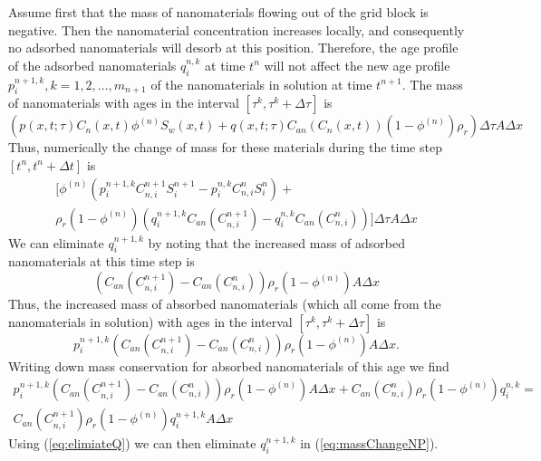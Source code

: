 \documentclass[nanomaterials,article,submit,moreauthors,pdftex]{Definitions/mdpi}
\begin{document}
Assume first that the mass of nanomaterials flowing out of the grid block is negative. Then the nanomaterial concentration increases locally, and consequently no adsorbed nanomaterials will desorb at this position. Therefore, the age profile of the adsorbed nanomaterials $q_i^{n,k}$ at time $t^n$ will not affect the new age profile  $p_i^{n+1,k},k=1,2,...,m_{n+1}$ of the nanomaterials in solution at time  $t^{n+1}$. The mass of nanomaterials with ages in the interval $\left[\tau^k, \tau^k+\Delta\tau\right]$ is
\begin{equation*}
    \left(p(x,t;\tau)C_n(x,t)\phi^{(n)}S_w(x,t) + q(x,t;\tau)C_{an}(C_n(x,t))(1-\phi^{(n)})\rho_r\right) \Delta\tau A\Delta x
\end{equation*}
Thus, numerically the change of mass for these materials during the time step $\left[t^n, t^n+\Delta t\right]$ is
\begin{multline} \label{eq:massChangeNP} %
    \bigg[\phi^{(n)}\left(p_i^{n+1,k}C_{n,i}^{n+1}S_i^{n+1}- p_{i}^{n,k}C_{n,i}^{n}S_{i}^{n}\right) +\\ \rho_r(1-\phi^{(n)}) \left(q_i^{n+1,k}C_{an}(C_{n,i}^{n+1})- q_{i}^{n,k}C_{an}(C_{n,i}^{n})\right)\bigg]
    \Delta\tau A\Delta x
\end{multline}
We can eliminate $q_{i}^{n+1,k}$ by noting that the increased mass of adsorbed nanomaterials at this time step is
\begin{equation*}
    \left(C_{an}(C_{n,i}^{n+1})- C_{an}(C_{n,i}^{n})\right)
    \rho_r\left(1-\phi^{(n)}\right) A\Delta x
\end{equation*}
Thus, the increased mass of absorbed nanomaterials (which all come from the nanomaterials in solution) with ages in the interval $\left[\tau^k, \tau^k+\Delta\tau\right]$ is
\begin{equation*}
    p_i^{n+1,k}\left(C_{an}(C_{n,i}^{n+1})- C_{an}(C_{n,i}^{n})\right)
    \rho_r\left(1-\phi^{(n)}\right) A\Delta x.
\end{equation*}
Writing down mass conservation for absorbed nanomaterials of this age we find
\begin{multline} \label{eq:elimiateQ} %
    p_i^{n+1,k}\left(C_{an}(C_{n,i}^{n+1})- C_{an}(C_{n,i}^{n})\right)
    \rho_r\left(1-\phi^{(n)}\right) A\Delta x +
    C_{an}(C_{n,i}^{n})\rho_r\left(1-\phi^{(n)}\right)q_i^{n,k} = \\
    C_{an}(C_{n,i}^{n+1})\rho_r\left(1-\phi^{(n)}\right)q_i^{n+1,k}A\Delta x 
\end{multline}
Using (\ref{eq:elimiateQ}) we can then eliminate $q_i^{n+1,k}$ in (\ref{eq:massChangeNP}). 
\end{document}
